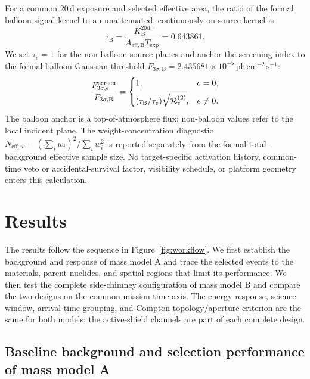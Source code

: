 \documentclass[11pt]{article}
\newcommand{\phcms}{\ensuremath{\,\mathrm{ph\,cm^{-2}\,s^{-1}}}}
\begin{document}
For a common 20\,d exposure and selected effective area, the ratio of the
formal balloon signal kernel to an unattenuated, continuously on-source kernel
is
\begin{equation}
 \tau_{\mathrm B}=
 \frac{K_{\mathrm B}^{20\mathrm d}}
 {A_{\mathrm{eff,B}}T_{\mathrm{exp}}}=0.643861 .
 \label{eq:environment_signal_factor}
\end{equation}
We set $\tau_e=1$ for the non-balloon source planes and anchor the screening
index to the formal balloon Gaussian threshold
$F_{3\sigma,\mathrm B}=2.435681\times10^{-5}\phcms$:
\begin{equation}
 \frac{F_{3\sigma,e}^{\mathrm{screen}}}{F_{3\sigma,\mathrm B}}=
 \begin{cases}
  1, & e=0,\\[3pt]
  (\tau_{\mathrm B}/\tau_e)\sqrt{{\cal R}^{(2)}_e}, & e\ne0 .
 \end{cases}
 \label{eq:environment_flux_screen}
\end{equation}
The balloon anchor is a top-of-atmosphere flux; non-balloon values refer to the
local incident plane. The weight-concentration diagnostic
$N_{\mathrm{eff},w}=(\sum_iw_i)^2/\sum_iw_i^2$ is reported separately from the
formal total-background effective sample size. No target-specific activation
history, common-time veto or accidental-survival factor, visibility schedule,
or platform geometry enters this calculation.

\section{Results}
\label{sec:results}

The results follow the sequence in Figure~\ref{fig:workflow}. We first establish the background and response of mass model A and trace the selected events to the materials, parent nuclides, and spatial regions that limit its performance. We then test the complete side-chimney configuration of mass model B and compare the two designs on the common mission time axis. The energy response, science window, arrival-time grouping, and Compton topology/aperture criterion are the same for both models; the active-shield channels are part of each complete design.

\subsection{Baseline background and selection performance of mass model A}
\label{subsec:model_a_baseline}
\label{subsec:reference_background_results}
\end{document}
